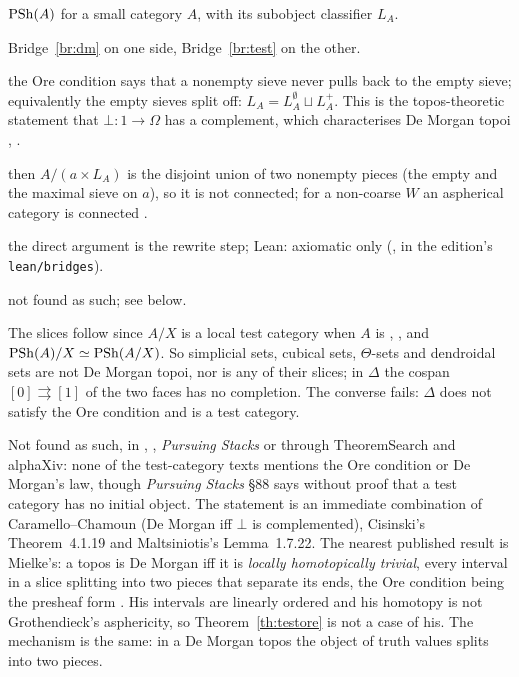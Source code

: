 \begin{trace}
\item[deck] $\mathrm{PSh}(A)$ for a small category $A$, with its subobject classifier $L_A$.
\item[arch] Bridge~\ref{br:dm} on one side, Bridge~\ref{br:test} on the other.
\item[specialise] the Ore condition says that a nonempty sieve never pulls back to the empty sieve; equivalently the empty sieves split off: $L_A = L_A^{\emptyset}\sqcup L_A^{+}$. This is the topos-theoretic statement that $\bot\colon 1\to\Omega$ has a complement, which characterises De Morgan topoi \cite[\S1]{caramello-demorgan}, \cite[Prop.~14]{caramello-chamoun}.
\item[rewrite] then $A/(a\times L_A)$ is the disjoint union of two nonempty pieces (the empty and the maximal sieve on $a$), so it is not connected; for a non-coarse $W$ an aspherical category is connected \cite[Lemme~1.7.22]{maltsiniotis-301}.
\item[verify] the direct argument is the rewrite step; Lean: axiomatic only (, in the edition's \texttt{lean/bridges}).
\item[novelty] not found as such; see below.
\end{trace}

\noindent The slices follow since $A/X$ is a local test category when $A$ is \cite[Prop.~4.1.14 (v)]{cisinski-308}, \cite[Rem.~1.5.4 b)]{maltsiniotis-301}, and $\mathrm{PSh}(A)/X\simeq\mathrm{PSh}(A/X)$. So simplicial sets, cubical sets, $\Theta$-sets and dendroidal sets are not De Morgan topoi, nor is any of their slices; in $\Delta$ the cospan $[0]\rightrightarrows[1]$ of the two faces has no completion. The converse fails: $\Delta$ does not satisfy the Ore condition and is a test category.

\status{} Not found as such, in \cite{cisinski-308}, \cite{maltsiniotis-301}, \emph{Pursuing Stacks} or through TheoremSearch and alphaXiv: none of the test-category texts mentions the Ore condition or De Morgan's law, though \emph{Pursuing Stacks} \S88 says without proof that a test category has no initial object. The statement is an immediate combination of Caramello--Chamoun (De Morgan iff $\bot$ is complemented), Cisinski's Theorem~4.1.19 and Maltsiniotis's Lemma~1.7.22. The nearest published result is Mielke's: a topos is De Morgan iff it is \emph{locally homotopically trivial}, every interval in a slice splitting into two pieces that separate its ends, the Ore condition being the presheaf form \cite[Th.~1.5, Cor.~1.6]{mielke}. His intervals are linearly ordered and his homotopy is not Grothendieck's asphericity, so Theorem~\ref{th:testore} is not a case of his. The mechanism is the same: in a De Morgan topos the object of truth values splits into two pieces.

